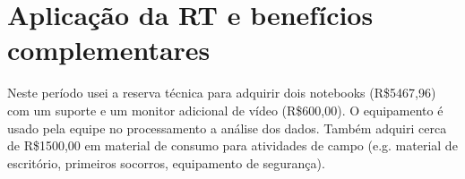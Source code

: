 \section{Aplicação da RT e benefícios complementares} %
Neste período usei a reserva técnica para adquirir dois notebooks (R\$5467,96)
com um suporte e um monitor adicional de vídeo (R\$600,00).
O equipamento é usado pela equipe no processamento a análise dos dados.
Também adquiri cerca de R\$1500,00 em material de consumo para atividades de campo
(e.g. material de escritório, primeiros socorros, equipamento de segurança).